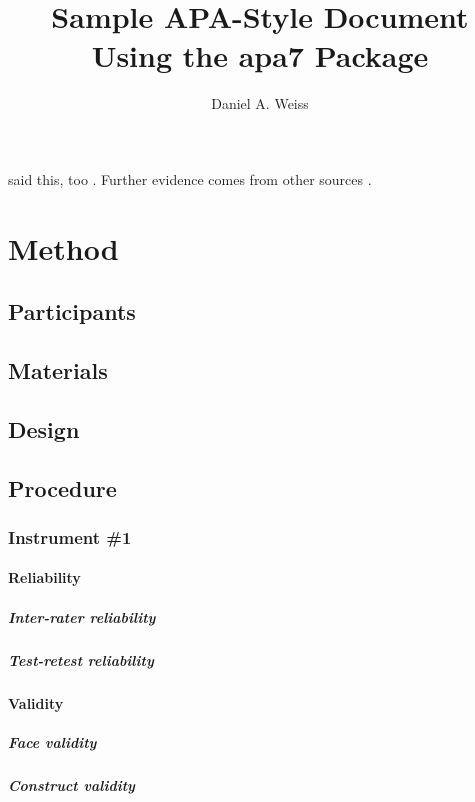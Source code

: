 \documentclass[man]{apa7}
\title{Sample APA-Style Document Using the \textsf{apa7} Package}
\author{Daniel A. Weiss}
\affiliation{A University Somewhere}
\begin{document}
	\maketitle
	\lipsum[2]
	
	\Textcite{vonDavier2011} said this,
	too \parencite{vonDavier2011,Lassen2006}.  Further evidence comes from
	other sources \parencite{Shotton1989,Lassen2006}.  \lipsum[3]
	
	\section{Method}
	\subsection{Participants}
	\lipsum[4]
	
	\subsection{Materials}
	\lipsum[5]
	
	\subsection{Design}
	\lipsum[6]
	
	\subsection{Procedure}
	\lipsum[7]
	
	\subsubsection{Instrument \#1}
	\lipsum[8]
	
	\paragraph{Reliability}
	\lipsum[9]
	
	\subparagraph{Inter-rater reliability}
	\lipsum[10]
	
	\subparagraph{Test-retest reliability}
	\lipsum[11]
	
	\paragraph{Validity}
	\lipsum[12]
	
	\subparagraph{Face validity}
	\lipsum[13]
	
	\subparagraph{Construct validity}
	\lipsum[14]
	
\end{document}

